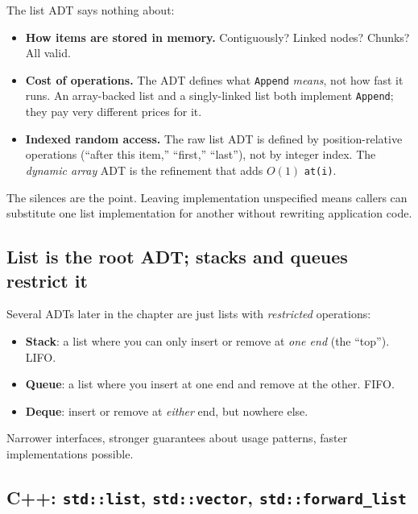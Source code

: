 \documentclass[11pt]{article}
\begin{document}
\begin{ideabox}
The list ADT says nothing about:
\begin{itemize}[leftmargin=*]
  \item \textbf{How items are stored in memory.} Contiguously?
        Linked nodes? Chunks? All valid.
  \item \textbf{Cost of operations.} The ADT defines what \texttt{Append}
        \emph{means}, not how fast it runs. An array-backed list and
        a singly-linked list both implement \texttt{Append}; they
        pay very different prices for it.
  \item \textbf{Indexed random access.} The raw list ADT is defined
        by position-relative operations (``after this item,''
        ``first,'' ``last''), not by integer index. The \emph{dynamic
        array} ADT is the refinement that adds $O(1)$
        \texttt{at(i)}.
\end{itemize}
The silences are the point. Leaving implementation unspecified means
callers can substitute one list implementation for another without
rewriting application code.
\end{ideabox}

\subsection{List is the root ADT; stacks and queues restrict it}

\begin{defnbox}
Several ADTs later in the chapter are just lists with
\emph{restricted} operations:
\begin{itemize}[leftmargin=*]
  \item \textbf{Stack}: a list where you can only insert or remove
        at \emph{one end} (the ``top''). LIFO.
  \item \textbf{Queue}: a list where you insert at one end and
        remove at the other. FIFO.
  \item \textbf{Deque}: insert or remove at \emph{either} end, but
        nowhere else.
\end{itemize}
Narrower interfaces, stronger guarantees about usage patterns,
faster implementations possible.
\end{defnbox}

\subsection{C++: \texttt{std::list}, \texttt{std::vector}, \texttt{std::forward\_list}}
\end{document}
